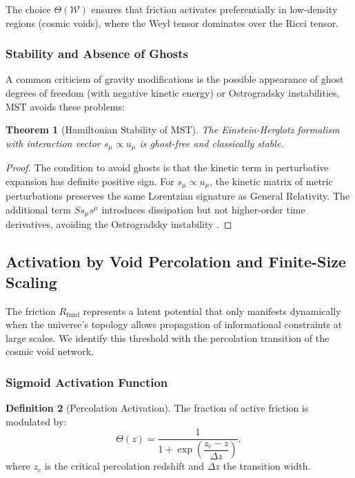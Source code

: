 \documentclass[11pt, a4paper]{article}
\theoremstyle{plain}
\newtheorem{theorem}{Theorem}[section]
\theoremstyle{definition}
\newtheorem{definition}[theorem]{Definition}
\newcommand{\Rfactor}{R_{\text{fund}}}
\begin{document}
The choice $\Theta(\mathcal{W})$ ensures that friction activates preferentially in low-density regions (cosmic voids), where the Weyl tensor dominates over the Ricci tensor.

\subsubsection{Stability and Absence of Ghosts}

A common criticism of gravity modifications is the possible appearance of ghost degrees of freedom (with negative kinetic energy) or Ostrogradsky instabilities. MST avoids these problems:

\begin{theorem}[Hamiltonian Stability of MST]
The Einstein-Herglotz formalism with interaction vector $s_\mu \propto u_\mu$ is ghost-free and classically stable.
\end{theorem}

\begin{proof}
The condition to avoid ghosts is that the kinetic term in perturbative expansion has definite positive sign. For $s_\mu \propto u_\mu$, the kinetic matrix of metric perturbations preserves the same Lorentzian signature as General Relativity. The additional term $S s_\mu s^\mu$ introduces dissipation but not higher-order time derivatives, avoiding the Ostrogradsky instability \cite{Lazo2017}.
\end{proof}

\subsection{Activation by Void Percolation and Finite-Size Scaling}

The friction $\Rfactor$ represents a latent potential that only manifests dynamically when the universe's topology allows propagation of informational constraints at large scales. We identify this threshold with the percolation transition of the cosmic void network.

\subsubsection{Sigmoid Activation Function}

\begin{definition}[Percolation Activation]
The fraction of active friction is modulated by:
\begin{equation}
\Theta(z) = \frac{1}{1 + \exp\left(\dfrac{z_c - z}{\Delta z}\right)},
\label{eq:activation_function}
\end{equation}
where $z_c$ is the critical percolation redshift and $\Delta z$ the transition width.
\end{definition}
\end{document}
